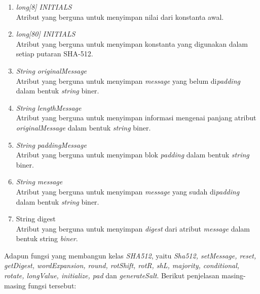 \begin{enumerate}
	\item \textit{long[8] INITIALS} \\
	Atribut yang berguna untuk menyimpan nilai dari konstanta awal.
	\item \textit{long[80] INITIALS} \\
	Atribut yang berguna untuk menyimpan konstanta yang digunakan dalam setiap putaran SHA-512.
	\item \textit{String originalMessage} \\
	Atribut yang berguna untuk menyimpan \textit{message} yang belum di\textit{padding} dalam bentuk \textit{string} biner.
	\item \textit{String lengthMessage} \\
	Atribut yang berguna untuk menyimpan informasi mengenai panjang atribut \textit{originalMessage} dalam bentuk \textit{string} biner.
	\item \textit{String paddingMessage} \\
	Atribut yang berguna untuk menyimpan blok \textit{padding} dalam bentuk \textit{string} biner.
	\item \textit{String message} \\
	Atribut yang berguna untuk menyimpan \textit{message} yang sudah di\textit{padding} dalam bentuk \textit{string} biner.
	\item String digest \\
	Atribut yang berguna untuk menyimpan \textit{digest} dari atribut \textit{message} dalam bentuk string \textit{biner}.
\end{enumerate}

Adapun fungsi yang membangun kelas \textit{SHA512}, yaitu \textit{Sha512, setMessage, reset, getDigest, wordExpansion, round, rotShift, rotR, shL, majority, conditional, rotate, longValue, initialize, pad} dan \textit{generateSalt}. Berikut penjelasan masing-masing fungsi tersebut:

